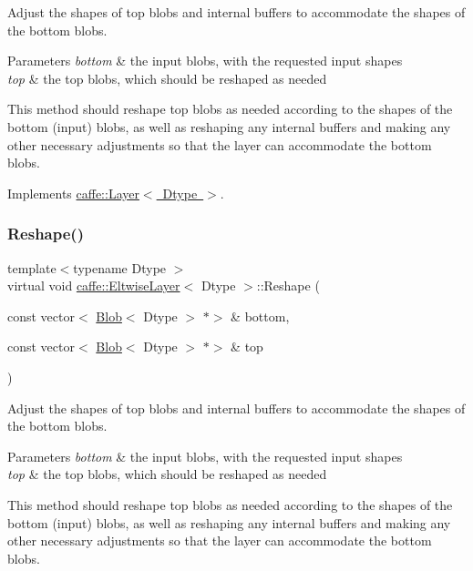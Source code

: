 Adjust the shapes of top blobs and internal buffers to accommodate the shapes of the bottom blobs. 


\begin{DoxyParams}{Parameters}
{\em bottom} & the input blobs, with the requested input shapes \\
\hline
{\em top} & the top blobs, which should be reshaped as needed\\
\hline
\end{DoxyParams}
This method should reshape top blobs as needed according to the shapes of the bottom (input) blobs, as well as reshaping any internal buffers and making any other necessary adjustments so that the layer can accommodate the bottom blobs. 

Implements \mbox{\hyperlink{classcaffe_1_1_layer_a7fe981e8af8d93d587acf2a952be563d}{caffe\+::\+Layer$<$ Dtype $>$}}.

\mbox{\label{classcaffe_1_1_eltwise_layer_a3f9e26946868f6249af1d4f57fc8259f}} 
\subsubsection{\texorpdfstring{Reshape()}{Reshape()}\hspace{0.1cm}{\footnotesize\ttfamily [2/2]}}
{\footnotesize\ttfamily template$<$typename Dtype $>$ \\
virtual void \mbox{\hyperlink{classcaffe_1_1_eltwise_layer}{caffe\+::\+Eltwise\+Layer}}$<$ Dtype $>$\+::Reshape (\begin{DoxyParamCaption}\item[{const vector$<$ \mbox{\hyperlink{classcaffe_1_1_blob}{Blob}}$<$ Dtype $>$ $\ast$$>$ \&}]{bottom,  }\item[{const vector$<$ \mbox{\hyperlink{classcaffe_1_1_blob}{Blob}}$<$ Dtype $>$ $\ast$$>$ \&}]{top }\end{DoxyParamCaption})\hspace{0.3cm}{\ttfamily [virtual]}}



Adjust the shapes of top blobs and internal buffers to accommodate the shapes of the bottom blobs. 


\begin{DoxyParams}{Parameters}
{\em bottom} & the input blobs, with the requested input shapes \\
\hline
{\em top} & the top blobs, which should be reshaped as needed\\
\hline
\end{DoxyParams}
This method should reshape top blobs as needed according to the shapes of the bottom (input) blobs, as well as reshaping any internal buffers and making any other necessary adjustments so that the layer can accommodate the bottom blobs. 

